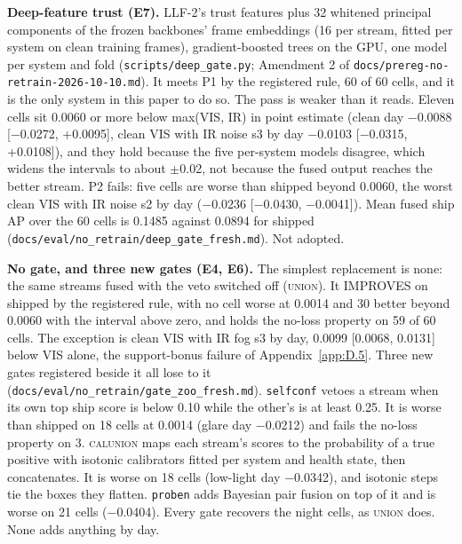 \documentclass[10pt]{article}
\begin{document}
\textbf{Deep-feature trust (E7).} LLF-2's trust features plus 32 whitened principal components of the frozen backbones' frame embeddings (16 per stream, fitted per system on clean training frames), gradient-boosted trees on the GPU, one model per system and fold (\texttt{scripts/\allowbreak{}deep\_\allowbreak{}gate.py}; Amendment 2 of \texttt{docs/\allowbreak{}prereg-no-retrain-2026-10-10.md}). It meets P1 by the registered rule, 60 of 60 cells, and it is the only system in this paper to do so. The pass is weaker than it reads. Eleven cells sit 0.0060 or more below max(VIS, IR) in point estimate (clean day $-$0.0088 [$-$0.0272, +0.0095], clean VIS with IR noise s3 by day $-$0.0103 [$-$0.0315, +0.0108]), and they hold because the five per-system models disagree, which widens the intervals to about $\pm$0.02, not because the fused output reaches the better stream. P2 fails: five cells are worse than shipped beyond 0.0060, the worst clean VIS with IR noise s2 by day ($-$0.0236 [$-$0.0430, $-$0.0041]). Mean fused ship AP over the 60 cells is 0.1485 against 0.0894 for shipped (\texttt{docs/\allowbreak{}eval/\allowbreak{}no\_\allowbreak{}retrain/\allowbreak{}deep\_\allowbreak{}gate\_\allowbreak{}fresh.md}). Not adopted.

\textbf{No gate, and three new gates (E4, E6).} The simplest replacement is none: the same streams fused with the veto switched off (\textsc{union}). It IMPROVES on shipped by the registered rule, with no cell worse at 0.0014 and 30 better beyond 0.0060 with the interval above zero, and holds the no-loss property on 59 of 60 cells. The exception is clean VIS with IR fog s3 by day, 0.0099 [0.0068, 0.0131] below VIS alone, the support-bonus failure of Appendix~\ref{app:D.5}. Three new gates registered beside it all lose to it (\texttt{docs/\allowbreak{}eval/\allowbreak{}no\_\allowbreak{}retrain/\allowbreak{}gate\_\allowbreak{}zoo\_\allowbreak{}fresh.md}). \texttt{selfconf} vetoes a stream when its own top ship score is below 0.10 while the other's is at least 0.25. It is worse than shipped on 18 cells at 0.0014 (glare day $-$0.0212) and fails the no-loss property on 3. \textsc{calunion} maps each stream's scores to the probability of a true positive with isotonic calibrators fitted per system and health state, then concatenates. It is worse on 18 cells (low-light day $-$0.0342), and isotonic steps tie the boxes they flatten. \texttt{proben} adds Bayesian pair fusion \citep{chen2022multimodal} on top of it and is worse on 21 cells ($-$0.0404). Every gate recovers the night cells, as \textsc{union} does. None adds anything by day.
\end{document}
